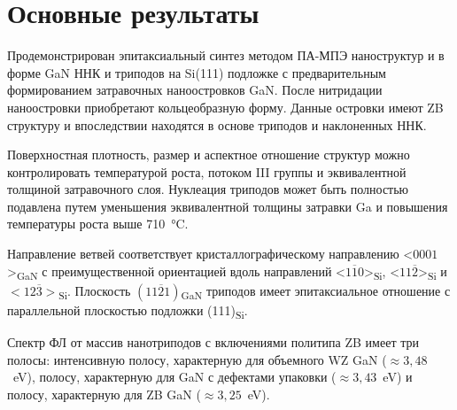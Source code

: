 \section{Основные результаты}\label{sec:ch3/sec7}

Продемонстрирован эпитаксиальный синтез методом ПА-МПЭ наноструктур и в форме GaN ННК и триподов на Si(111) подложке с предварительным формированием затравочных наноостровков GaN. После нитридации наноостровки приобретают кольцеобразную форму. Данные островки имеют ZB структуру и впоследствии находятся в основе триподов и наклоненных ННК.

Поверхностная плотность, размер и аспектное отношение структур можно контролировать температурой роста, потоком III группы и эквивалентной толщиной затравочного слоя. Нуклеация триподов может быть полностью подавлена путем уменьшения эквивалентной толщины затравки Ga и повышения температуры роста выше 710~\si{\degreeCelsius}.

Направление ветвей соответствует кристаллографическому направлению <\(0001\)>\textsubscript{GaN} с преимущественной ориентацией вдоль направлений <\(1\overline{1}0\)>\textsubscript{Si}, <\(11\overline{2}\)>\textsubscript{Si} и \(<12\overline{3}>\)\textsubscript{Si}. Плоскость \((11\overline{2}1)\)\textsubscript{GaN} триподов имеет эпитаксиальное отношение с параллельной плоскостью подложки (111)\textsubscript{Si}.

Спектр ФЛ от массив нанотриподов с включениями политипа ZB имеет три полосы: интенсивную полосу, характерную для объемного WZ GaN (\(\approx 3,48\)~\si{\electronvolt}), полосу, характерную для GaN с дефектами упаковки (\(\approx 3,43\)~\si{\electronvolt}) и полосу, характерную для ZB GaN (\(\approx 3,25\)~\si{\electronvolt}).

\FloatBarrier
